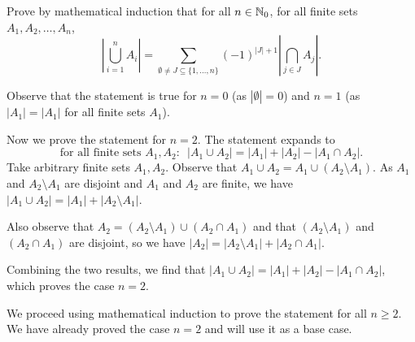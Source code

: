 \question
Prove by mathematical induction that for all $n\in\mathbb{N}_0$, for all finite sets $A_1,A_2,\dots,A_n$, \[\left|\bigcup_{i=1}^n A_i\right| = \sum_{\emptyset\neq J\subseteq\{1,\dots,n\}}(-1)^{|J|+1}\left|\bigcap_{j\in J}A_j\right|.\]

\begin{solution}
	Observe that the statement is true for $n=0$ (as $|\emptyset|=0$) and $n=1$ (as $|A_1|=|A_1|$ for all finite sets $A_1$).

	Now we prove the statement for $n=2$. The statement expands to \[\text{for all finite sets $A_1, A_2$:}~~~|A_1\cup A_2|=|A_1|+|A_2|-|A_1\cap A_2|.\]
	Take arbitrary finite sets $A_1, A_2$. Observe that $A_1\cup A_2=A_1\cup(A_2\setminus A_1)$. As $A_1$ and $A_2\setminus A_1$ are disjoint and $A_1$ and $A_2$ are finite, we have $|A_1\cup A_2| = |A_1|+|A_2\setminus A_1|$.

	Also observe that $A_2=(A_2\setminus A_1)\cup(A_2\cap A_1)$ and that $(A_2\setminus A_1)$ and $(A_2\cap A_1)$ are disjoint, so we have $|A_2|=|A_2\setminus A_1|+|A_2\cap A_1|$.

	Combining the two results, we find that $|A_1\cup A_2|=|A_1|+|A_2|-|A_1\cap A_2|$, which proves the case $n=2$.

	We proceed using mathematical induction to prove the statement for all $n\geq2$. We have already proved the case $n=2$ and will use it as a base case.


\end{solution}

